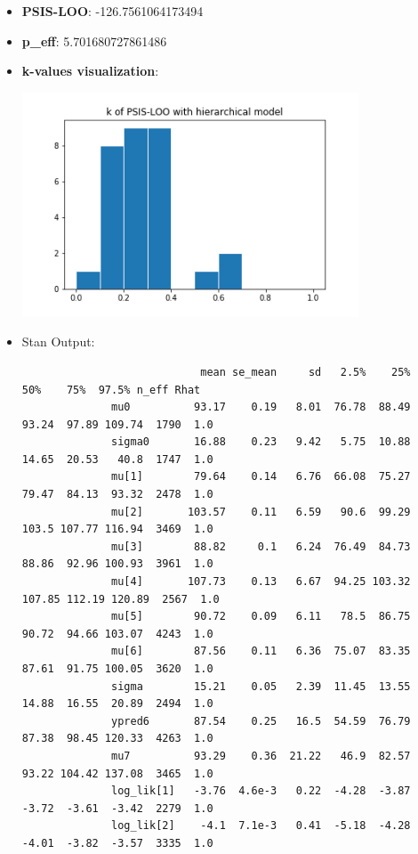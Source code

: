 \documentclass[11pt,a4paper,english]{article}
\begin{document}
        \begin{itemize}
          \item \textbf{PSIS-LOO}: -126.7561064173494
          \item \textbf{p\_eff}: 5.701680727861486
          \item \textbf{k-values visualization}:
            \begin{center}
              \includegraphics[width=10cm]{hierarchical_hist.png}
            \end{center}
          \item Stan Output:
            \begin{verbatim}
                            mean se_mean     sd   2.5%    25%    50%    75%  97.5% n_eff Rhat
              mu0          93.17    0.19   8.01  76.78  88.49  93.24  97.89 109.74  1790  1.0
              sigma0       16.88    0.23   9.42   5.75  10.88  14.65  20.53   40.8  1747  1.0
              mu[1]        79.64    0.14   6.76  66.08  75.27  79.47  84.13  93.32  2478  1.0
              mu[2]       103.57    0.11   6.59   90.6  99.29  103.5 107.77 116.94  3469  1.0
              mu[3]        88.82     0.1   6.24  76.49  84.73  88.86  92.96 100.93  3961  1.0
              mu[4]       107.73    0.13   6.67  94.25 103.32 107.85 112.19 120.89  2567  1.0
              mu[5]        90.72    0.09   6.11   78.5  86.75  90.72  94.66 103.07  4243  1.0
              mu[6]        87.56    0.11   6.36  75.07  83.35  87.61  91.75 100.05  3620  1.0
              sigma        15.21    0.05   2.39  11.45  13.55  14.88  16.55  20.89  2494  1.0
              ypred6       87.54    0.25   16.5  54.59  76.79  87.38  98.45 120.33  4263  1.0
              mu7          93.29    0.36  21.22   46.9  82.57  93.22 104.42 137.08  3465  1.0
              log_lik[1]   -3.76  4.6e-3   0.22  -4.28  -3.87  -3.72  -3.61  -3.42  2279  1.0
              log_lik[2]    -4.1  7.1e-3   0.41  -5.18  -4.28  -4.01  -3.82  -3.57  3335  1.0

\end{verbatim}
\end{itemize}
\end{document}
